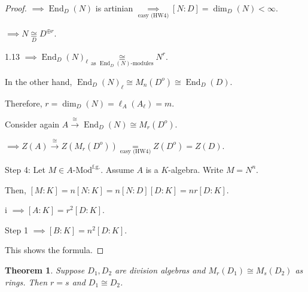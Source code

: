 \documentclass{article}
\theoremstyle{definition}
\theoremstyle{plain}
\newtheorem{theorem}{Theorem}[section]
\theoremstyle{remark}
\begin{document}
\begin{proof}
        \(\implies \operatorname{End}_D(N)\) is artinian \(\underset{\text{easy (HW4)}}{\implies} [N:D] = \dim_D(N) < \infty\).
        
        \(\implies N \underset{D}{\cong} D^{\oplus r}\).

        1.13 \(\implies \operatorname{End}_D(N)_\ell \underset{\text{as } \operatorname{End}_D(N) \text{-modules} }{\cong} N^r \).

        In the other hand, \(\operatorname{End}_D(N)_\ell \cong M_n(D^o) \cong \operatorname{End}_D(D)\).
        
        Therefore, \(r = \dim_D(N) = \ell_A(A_\ell) = m\).
        
        Consider again \(A \xrightarrow{\cong} \operatorname{End}_D(N) \cong M_r(D^o)\).

        \(\implies Z(A) \xrightarrow{\cong} Z(M_r(D^o)) \underset{\text{easy (HW4)}}{=} Z(D^o) = Z(D)\).
        
        Step 4: Let \(M\in A\text{-Mod}^{\text{f.g.}}\). Assume \(A\) is a \(K\)-algebra. Write \(M = N^n\).

        Then, \([M:K] = n[N:K] = n[N:D][D:K] = nr [D:K]\).

        i \(\implies [A:K] = r^2 [D:K]\).

        Step 1 \(\implies [B:K] = n^2[D:K]\).

        This shows the formula.

    \end{proof}

    \begin{theorem}
        Suppose \(D_1, D_2\) are division algebras and \(M_r(D_1) \cong M_s(D_2)\) as rings. Then \(r=s\) and \(D_1 \cong D_2\).
    \end{theorem}
\end{document}

